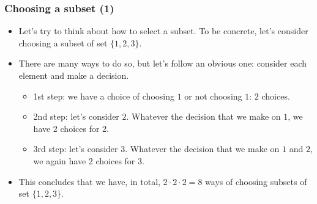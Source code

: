 \begin{frame}\frametitle{Choosing a subset (1)}
  \begin{itemize}
  \item Let's try to think about how to select a subset.  To be
    concrete, let's consider choosing a subset of set $\{1,2,3\}$.
  \item There are many ways to do so, but let's follow an obvious one:
    consider each element and make a decision.
    \pause
    \begin{itemize}
    \item 1st step: we have a choice of choosing $1$ or not choosing
      $1$: $2$ choices.
      \pause
    \item 2nd step: let's consider $2$.  Whatever the decision that we
      make on $1$, we have 2 choices for $2$.
      \pause
    \item 3rd step: let's consider $3$. Whatever the decision that we
      make on $1$ and $2$, we again have 2 choices for $3$.
    \end{itemize}
    \pause
  \item This concludes that we have, in total, $2\cdot 2\cdot 2=8$
    ways of choosing subsets of set $\{1,2,3\}$.
  \end{itemize}
\end{frame}

